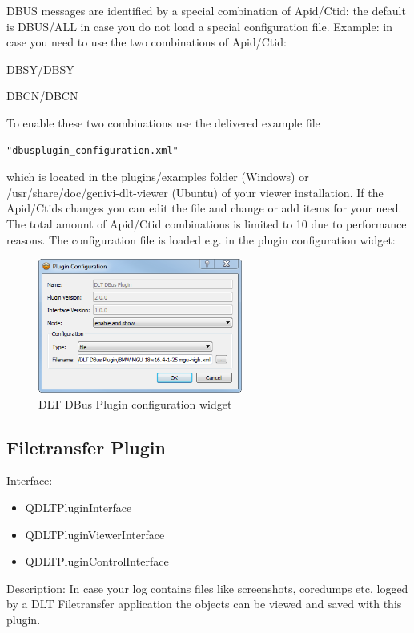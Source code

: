\documentclass[a4paper,11pt]{article}
\begin{document}
DBUS messages are identified by a special combination of Apid/Ctid: the default is DBUS/ALL in case you do not load a special configuration file.\linebreak
Example: in case you need to use the two combinations of Apid/Ctid:

DBSY/DBSY

DBCN/DBCN


To enable these two combinations use the delivered example file \begin{verbatim}"dbusplugin_configuration.xml" \end{verbatim}
which is located in the plugins/examples folder (Windows) or /usr/share/doc/genivi-dlt-viewer (Ubuntu) of your viewer installation.
If the Apid/Ctids changes you can edit the file and change or add items for your need. The total amount of Apid/Ctid combinations
is limited to 10 due to performance reasons.\linebreak
The configuration file is loaded e.g. in the plugin configuration widget:


\begin{figure}[H]
 \centering
 \includegraphics[width=0.6\textwidth]{images/dbus_configure.png}
 \caption{DLT DBus Plugin configuration widget}
 \label{fig:dbuspluginconfigurationwidget}
\end{figure}

\subsection{Filetransfer Plugin}

Interface:
\begin{itemize}
    \item QDLTPluginInterface
    \item QDLTPluginViewerInterface
    \item QDLTPluginControlInterface
\end{itemize}
Description:
    In case your log contains files like screenshots, coredumps etc. logged by a DLT Filetransfer application
    the objects can be viewed and saved with this plugin. \linebreak
\end{document}
